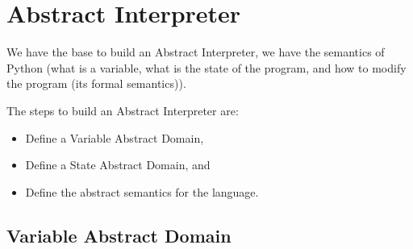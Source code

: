 %
%
%

\section{Abstract Interpreter}\label{abstract-interpreter}

We have the base to build an Abstract Interpreter, we have the semantics
of Python (what is a variable, what is the state of the program, and how
to modify the program (its formal semantics)).

The steps to build an Abstract Interpreter are:

\begin{itemize}
\tightlist
\item
  Define a Variable Abstract Domain,
\item
  Define a State Abstract Domain, and
\item
  Define the abstract semantics for the language.
\end{itemize}

\subsection{Variable Abstract Domain}\label{variable-abstract-domain}

